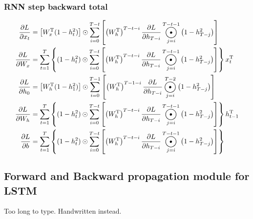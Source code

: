 \documentclass[12pt]{article}
\DeclareMathOperator*{\Odot}{\scalerel*{\odot}{\sum}}
\begin{document}
\setcounter{subsubsection}{3}
\subsubsection{RNN step backward total}
\begin{align*}
    \frac{\partial L}{\partial x_t}&=\left[W_x^\mathrm{T}(1-h_t^2)\right]\odot
        \sum_{i=0}^{T-t}\left[\left(W_h^\mathrm{T}\right)^{T-t-i}\frac{\partial L}{\partial h_{T-i}}\Odot_{j=i}^{T-t-1}\left(1-h_{T-j}^2 \right) \right]\\
    \frac{\partial L}{\partial W_x}&=\sum_{t=1}^{T}
        \left\{(1-h_t^2)\odot \sum_{i=0}^{T-t}
        \left[\left(W_h^\mathrm{T}\right)^{T-t-i}\frac{\partial L}{\partial h_{T-i}}
        \Odot_{j=i}^{T-t-1}\left(1-h_{T-j}^2 \right) \right]\right\}x_t^{\mathrm{T}}\\
    \frac{\partial L}{\partial h_0}&=\left[W_h^\mathrm{T}(1-h_1^2)\right]\odot
        \sum_{i=0}^{T-1}\left[\left(W_h^\mathrm{T}\right)^{T-1-i}\frac{\partial L}{\partial h_{T-i}}\Odot_{j=i}^{T-2}\left(1-h_{T-j}^2 \right) \right]\\
    \frac{\partial L}{\partial W_h}&=\sum_{t=1}^{T}
        \left\{(1-h_t^2)\odot \sum_{i=0}^{T-t}
        \left[\left(W_h^\mathrm{T}\right)^{T-t-i}\frac{\partial L}{\partial h_{T-i}}
        \Odot_{j=i}^{T-t-1}\left(1-h_{T-j}^2 \right) \right]\right\}h_{t-1}^{\mathrm{T}}\\
    \frac{\partial L}{\partial b}&=\sum_{t=1}^{T}
        \left\{(1-h_t^2)\odot \sum_{i=0}^{T-t}
        \left[\left(W_h^\mathrm{T}\right)^{T-t-i}\frac{\partial L}{\partial h_{T-i}}
        \Odot_{j=i}^{T-t-1}\left(1-h_{T-j}^2 \right) \right]\right\}
\end{align*}

\subsection{Forward and Backward propagation module for LSTM}
Too long to type.
Handwritten instead.



\newpage
\end{document}
